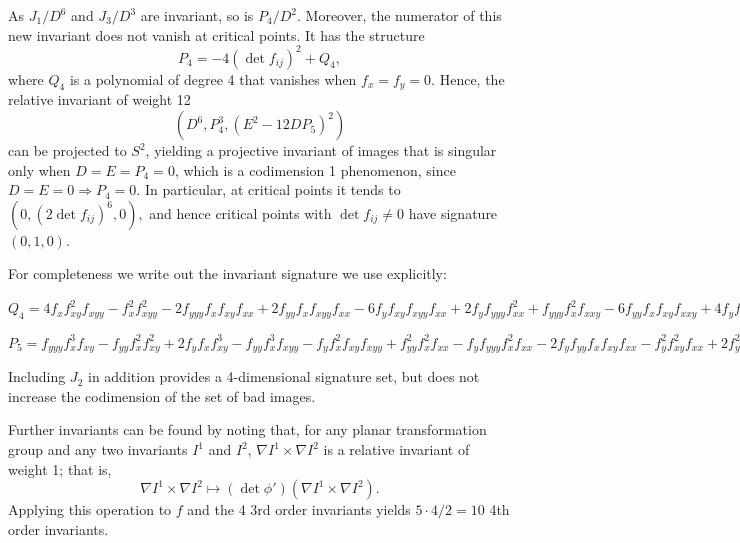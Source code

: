 \documentclass[review,onefignum,onetabnum]{siamonline190516}
\begin{document}
{As $J_1/D^6$ and $J_3/D^3$ are invariant, so is $P_4/D^2$. 
Moreover, the numerator of this new invariant does not vanish at critical points.  It has the structure
$$P_4 = -4(\det f_{ij})^2 + Q_4,$$
where $Q_4$ is a polynomial of degree 4 that vanishes when $f_x=f_y=0$. Hence, the relative invariant of weight 12
$$ (D^6, P_4^3, (E^2-12D P_5)^2)$$
can be projected to $S^2$, yielding a projective invariant of images that is singular only when $D=E=P_4=0$, which is a codimension 1 phenomenon, since  $D=E=0\Rightarrow P_4=0$. In particular, at critical points it tends to
$(0, (2\det f_{ij})^6, 0),$ and hence critical points with $\det f_{ij}\ne 0$ have signature $(0,1,0)$.

For completeness we write out the invariant signature we use explicitly:

$Q_4=4 f_x  f_{xy} ^2 f_{xyy}  - 
f_x ^2 f_{xyy} ^2 - 
 2 f_{yyy}  f_x  f_{xy}  f_{xx}  + 
 2 f_{yy}  f_x  f_{xyy}  f_{xx}  - 
 6 f_{y}  f_{xy}  f_{xyy}  f_{xx}  + 
 2 f_{y}  f_{yyy}  f_{xx} ^2 + 
 f_{yyy}  f_x ^2 f_{xxy}  - 
 6 f_{yy}  f_x  f_{xy}  f_{xxy}  + 
 4 f_{y}  f_{xy} ^2 f_{xxy}  + 
 f_{y}  f_x  f_{xyy}  f_{xxy}  + 
 2 f_{y}  f_{yy}  f_{xx}  f_{xxy}  - 
 f_{y} ^2 f_{xxy} ^2 + 
 2 f_{yy} ^2 f_x  f_{xxx}  - 
 f_{y}  f_{yyy}  f_x  f_{xxx}  - 
 2 f_{y}  f_{yy}  f_{xy}  f_{xxx}  + f_{y} ^2 f_{xyy}  f_{xxx} $
 
$P_5=f_{yyy}  f_{x} ^3 f_{xy}  - 
f_{yy}  f_{x} ^2 f_{xy} ^2 + 
 2 f_{y}  f_{x}  f_{xy} ^3 - 
 f_{yy}  f_{x} ^3 f_{xyy}  - 
 f_{y}  f_{x} ^2 f_{xy}  f_{xyy}  + 
 f_{yy} ^2 f_{x} ^2 f_{xx}  - 
 f_{y}  f_{yyy}  f_{x} ^2 f_{xx}  - 
 2 f_{y}  f_{yy}  f_{x}  f_{xy}  f_{xx}  - 
 f_{y} ^2 f_{xy} ^2 f_{xx}  + 
 2 f_{y} ^2 f_{x}  f_{xyy}  f_{xx}  + 
 f_{y} ^2 f_{yy}  f_{xx} ^2 + 
 2 f_{y}  f_{yy}  f_{x} ^2 f_{xxy}  - 
 f_{y} ^2 f_{x}  f_{xy}  f_{xxy}  - 
 f_{y} ^3 f_{xx}  f_{xxy}  - 
 f_{y} ^2 f_{yy}  f_{x}  f_{xxx}  + 
 f_{y} ^3 f_{xy}  f_{xxx} $
 
Including $J_2$ in addition provides a 4-dimensional signature set, but does not increase the codimension of the set of bad images.
 
Further invariants can be found by noting that, for any planar transformation group and any two invariants
$I^1$ and $I^2$, $\nabla I^1 \times \nabla I^2$ is a relative invariant of weight 1; that is,
$$\nabla I^1 \times \nabla I^2\mapsto (\det \phi')(\nabla I^1 \times \nabla I^2).$$
Applying this operation to $f$ and the 4 3rd order invariants yields $5\cdot4/2=10$ 4th order invariants.

}
\end{document}
